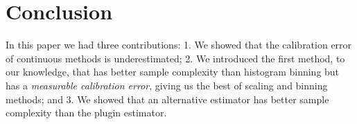 \section{Conclusion}

 In this paper we had three contributions: 1. We showed that the calibration error of continuous methods is underestimated; 2. We introduced the first method, to our knowledge, that has better sample complexity than histogram binning  but has a \emph{measurable calibration error}, giving us the best of scaling and binning methods; and 3. We showed that an alternative estimator  has better sample complexity than the plugin estimator.

